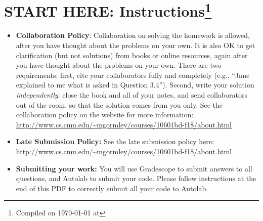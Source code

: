 \documentclass{article}
\begin{document}
\section*{START HERE: Instructions\footnote{Compiled on \today{} at \currenttime{}}}
\begin{itemize}

\item \textbf{Collaboration Policy}: Collaboration on solving the homework is allowed, after you have thought about the problems on your own. It is also OK to get clarification (but not solutions) from books or online resources, again after you have thought about the problems on your own. There are two requirements: first, cite your collaborators fully and completely (e.g., ``Jane explained to me what is asked in Question 3.4''). Second, write your solution {\em independently}: close the book and all of your notes, and send collaborators out of the room, so that the solution comes from you only.  See the collaboration policy on the website for more information: \url{http://www.cs.cmu.edu/~mgormley/courses/10601bd-f18/about.html}
\item\textbf{Late Submission Policy:} See the late submission policy
  here:
  \url{http://www.cs.cmu.edu/~mgormley/courses/10601bd-f18/about.html}

\item\textbf{Submitting your work:} You will use Gradescope to submit
  answers to all questions, and Autolab to submit your code. Please
  follow instructions at the end of this PDF to correctly submit all your code to Autolab.

  \begin{itemize}
    
\begin{comment}
  \item \textbf{Canvas:} Canvas (\url{https://canvas.cmu.edu}) will be
    used for quiz-style problems (e.g. multiple choice, true / false,
    numerical answers). Grading is done automatically.
    You may only \textbf{submit once} on canvas, so be sure of your
    answers before you submit. However, canvas allows you to work on
    your answers and then close out of the page and it will save your
    progress.  You will not be granted additional submissions, so
    please be confident of your solutions when you are submitting your
    assignment.
    {\color{red} The above is true for future assignments, but this one
    allows {\bf unlimited submissions}.}
\end{comment}
    

\end{itemize}
\end{itemize}
\end{document}
